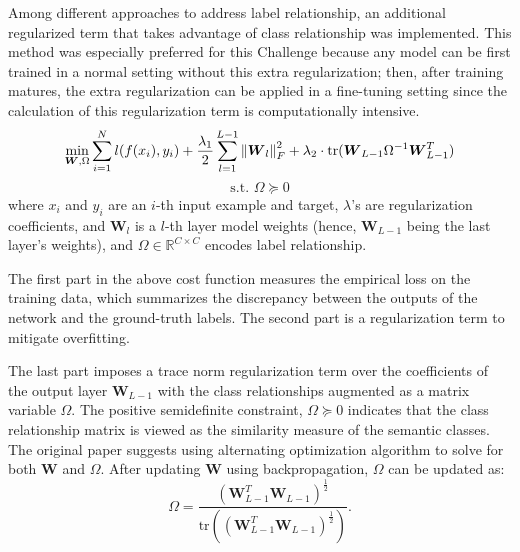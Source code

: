 \documentclass[runningheads]{llncs}
\newcommand\norm[1]{\left\lVert#1\right\rVert}
\begin{document}
Among different approaches to address label relationship, an additional regularized term that takes advantage of class relationship \cite{jiang2018} was implemented.
This method was especially preferred for this Challenge because any model can be first trained in a normal setting without this extra regularization; then, after training matures, the extra regularization can be applied in a fine-tuning setting since the calculation of this regularization term is computationally intensive.
\begin{equation}
        \min_{\boldsymbol{W}, \Omega} \sum_{i=1}^{N} l(f(x_i), y_i) + \frac{\lambda_1}{2} \sum_{l=1}^{L-1} \norm{ \boldsymbol{W}_l }_F^2 + \lambda_2 \cdot \textrm{tr}( \boldsymbol{W}_{L-1} \Omega^{-1} \boldsymbol{W}_{L-1}^T) \\
\end{equation}
\[
        \textrm{s.t. } \Omega \succeq 0
\]
where $x_i$ and $y_i$ are an $i$-th input example and target, $\lambda$'s are regularization coefficients, and $\boldsymbol{W}_l$ is a $l$-th layer model weights (hence, $\boldsymbol{W}_{L-1}$ being the last layer's weights), and $\Omega \in \mathbb{R}^{C \times C}$ encodes label relationship.

The first part in the above cost function measures the empirical loss on the training data, which summarizes the discrepancy between the outputs of the network and the ground-truth labels.
The second part is a regularization term to mitigate overfitting.

The last part imposes a trace norm regularization term over the coefficients of the output layer $\boldsymbol{W}_{L-1}$ with the class relationships augmented as a matrix variable $\Omega$.
The positive semidefinite constraint, $\Omega \succeq 0$ indicates that the class relationship matrix is viewed as the similarity measure of the semantic classes.
The original paper \cite{jiang2018} suggests using alternating optimization algorithm to solve for both $\boldsymbol{W}$ and $\Omega$. After updating $\boldsymbol{W}$ using backpropagation, $\Omega$ can be updated as:
\begin{equation}
        \Omega = \frac
        { ( \boldsymbol{W}_{L-1}^T \boldsymbol{W}_{L-1} )^\frac{1}{2}  }
        { \textrm{tr} (( \boldsymbol{W}_{L-1}^T \boldsymbol{W}_{L-1} )^\frac{1}{2} )  }.
\end{equation}

\end{document}
